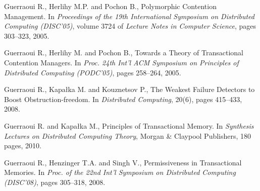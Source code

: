 \begin{thebibliography}{99}
{
Guerraoui R., Herlihy M.P. and Pochon B.,
\newblock Polymorphic {C}ontention {M}anagement.
\newblock In {\em Proceedings of the 19th {I}nternational {S}ymposium on
  {D}istributed {C}omputing ({DISC}'05)}, volume 3724 of {\em Lecture Notes in
  Computer Science}, pages 303--323, 2005.



Guerraoui R.,  Herlihy M. and  Pochon B., 
 Towards a Theory of Transactional Contention Managers. 
In {\it  Proc. 24th  Int'l  ACM Symposium on Principles of  Distributed 
Computing (PODC'05)}, pages 258--264,  2005. 







Guerraoui R., Kapa\l{}ka M. and  Kouznetsov P., 
The Weakest Failure Detectors to Boost Obstruction-freedom. 
In {\it Distributed Computing}, 20(6), pages 415--433, 2008. 


Guerraoui R. and  Kapa\l{}ka M.,
Principles of Transactional Memory. 
In {\it Synthesis Lectures on Distributed Computing Theory},
 Morgan \& Claypool Publishers, 180 pages, 2010. 




Guerraoui R., Henzinger T.A. and Singh V.,
Permissiveness  in Transactional Memories. 
In {\em Proc. of the 22nd Int'l Symposium on Distributed Computing (DISC'08)}, pages 305--318, 2008.


% 
% 




}
\end{thebibliography}
